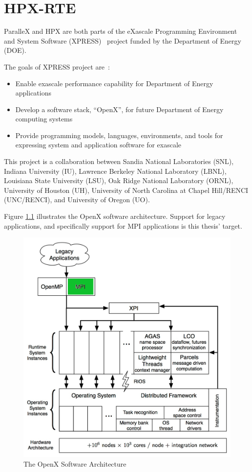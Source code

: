 \chapter{HPX-RTE}
\label{sec:HPX-RTE}
ParalleX and HPX are both parts of the eXascale Programming Environment and System Software (XPRESS)~\cite{huck2013early,brightwell2013xpress} project funded by the Department of Energy (DOE).

The goals of XPRESS project are~\cite{xpress}:
\begin{itemize}
\item Enable exascale performance capability for Department of Energy applications
\item Develop a software stack, ``OpenX'', for future Department of Energy computing systems
\item Provide programming models, languages, environments, and tools for expressing system and application software for exascale
\end{itemize}

This project is a collaboration between Sandia National Laboratories (SNL), Indiana University (IU), Lawrence Berkeley National Laboratory (LBNL), Louisiana State University (LSU), Oak Ridge National Laboratory (ORNL), University of Houston (UH), University of North Carolina at Chapel Hill/RENCI (UNC/RENCI), and University of Oregon (UO).

Figure \ref{fig:openx} illustrates the OpenX software architecture. Support for legacy applications, and specifically support for MPI applications is this thesis' target.

\begin{figure}[h!]
\centering
\includegraphics[scale=0.75]{images/openx.png}
\caption[The OpenX Software Architecture]{The OpenX Software Architecture}
\label{fig:openx}
\end{figure}


